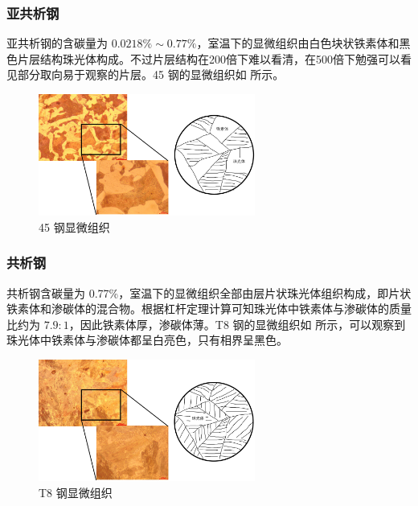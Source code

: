 \documentclass[a4paper,utf8]{article}
\begin{document}
        \subsubsection{亚共析钢}
            亚共析钢的含碳量为 $0.0218\%\sim 0.77\%$，室温下的显微组织由白色块状铁素体和黑色片层结构珠光体构成。不过片层结构在200倍下难以看清，在500倍下勉强可以看见部分取向易于观察的片层。45 钢的显微组织如 所示。
            \begin{figure}[!ht]
                \includegraphics[height=40mm]{result/2.pdf}
                \caption{45 钢显微组织\label{fig:2}}
            \end{figure}

        \subsubsection{共析钢}
            共析钢含碳量为 0.77\%，室温下的显微组织全部由层片状珠光体组织构成，即片状铁素体和渗碳体的混合物。根据杠杆定理计算可知珠光体中铁素体与渗碳体的质量比约为 $7.9:1$，因此铁素体厚，渗碳体薄。T8 钢的显微组织如 所示，可以观察到珠光体中铁素体与渗碳体都呈白亮色，只有相界呈黑色。
            \begin{figure}[!ht]
                \includegraphics[height=40mm]{result/3.pdf}
                \caption{T8 钢显微组织\label{fig:3}}
            \end{figure}
\end{document}
